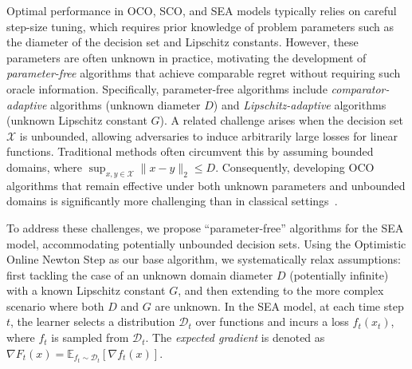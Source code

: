 \documentclass{article}
\theoremstyle{plain}
\theoremstyle{definition}
\theoremstyle{remark}
\newcommand{\cD}{\mathcal{D}}
\newcommand{\cX}{\mathcal{X}}
\begin{document}
Optimal performance in OCO, SCO, and SEA models typically relies on careful step-size tuning, which requires prior knowledge of problem parameters such as the diameter of the decision set and Lipschitz constants. However, these parameters are often unknown in practice, motivating the development of \emph{parameter-free} algorithms that achieve comparable regret without requiring such oracle information. Specifically, parameter-free algorithms include \emph{comparator-adaptive} algorithms (unknown diameter $D$) and \emph{Lipschitz-adaptive} algorithms (unknown Lipschitz constant $G$).  A related challenge arises when the decision set $\cX$ is unbounded, allowing adversaries to induce arbitrarily large losses for linear functions. Traditional methods often circumvent this by assuming bounded domains, where $\sup_{x,y\in\cX}\|x-y\|_2\leq D$. Consequently, developing OCO algorithms that remain effective under both unknown parameters and unbounded domains is significantly more challenging than in classical settings~\cite{cutkosky2018black,chen2021impossible,jacobsen2023unconstrained}.


To address these challenges, we propose ``parameter-free'' algorithms for the SEA model, accommodating potentially unbounded decision sets. Using the Optimistic Online Newton Step as our base algorithm, we systematically relax assumptions: first tackling the case of an unknown domain diameter $D$ (potentially infinite) with a known Lipschitz constant $G$, and then extending to the more complex scenario where both $D$ and $G$ are unknown. In the SEA model, at each time step $t$, the learner selects a distribution $\cD_t$ over functions and incurs a loss $f_t(x_t)$, where $f_t$ is sampled from $\cD_t$. The \textit{expected gradient} is denoted as $\nabla F_t(x) = \mathbb{E}_{f_t \sim \mathcal{D}_t}[\nabla f_t(x)]$. %
\end{document}
